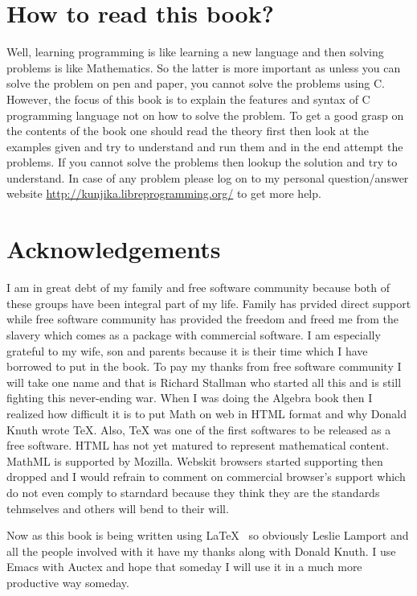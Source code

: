 \section{How to read this book?}
Well, learning programming is like learning a new language and then solving
problems is like Mathematics. So the latter is more important as unless you can
solve the problem on pen and paper, you cannot solve the problems using
C. However, the focus of this book is to explain the features and syntax of C
programming language not on how to solve the problem. To get a good grasp
on the contents of the book one should read the theory first then look at the
examples given and try to understand and run them and in the end attempt
the problems. If you cannot solve the problems then lookup the solution and
try to understand. In case of any problem please log on to my personal
question/answer website \url{http://kunjika.libreprogramming.org/} to get
more help.

\section{Acknowledgements}
I am in great debt of my family and free software community because both of
these groups have been integral part of my life. Family has prvided direct
support while free software community has provided the freedom and freed me
from the slavery which comes as a package with commercial software. I am
especially grateful to my wife, son and parents because it is their time which
I have borrowed to put in the book. To pay my thanks from free software
community  I will take one name and that is Richard Stallman who started all
this  and is still fighting this never-ending war. When I was doing the Algebra
book then I realized how difficult it is to put Math on web in HTML format and
why Donald Knuth wrote \TeX{}. Also, \TeX{} was one of the first softwares to
be released as a free software. HTML has not yet matured to represent
mathematical content. MathML is supported by Mozilla. Webskit browsers started
supporting 
then dropped and I would refrain to comment on commercial browser's support
which do not even comply to starndard because they think they are the standards
tehmselves and others will bend to their will.

Now as this book is being written using \LaTeX{}~ so obviously Leslie Lamport
and all the people involved with it have my thanks along with Donald Knuth. I
use Emacs with Auctex and hope that someday I will use it in a much more
productive way someday.

